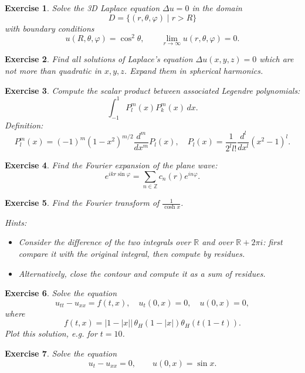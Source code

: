 \documentclass[11pt,a4paper]{article}
\newtheorem*{exercise}{Exercise}
\begin{document}
{\begin{exercise}
	Solve the 3D Laplace equation $\Delta u = 0$ in the domain
	\[
	D = \{(r, \theta, \varphi) \mid r > R\}
	\]
	with boundary conditions
	\[
	u(R, \theta, \varphi) = \cos^2\theta, \qquad \lim_{r \to \infty} u(r, \theta, \varphi) = 0.
	\]
\end{exercise}

\begin{exercise}
	Find all solutions of Laplace’s equation $\Delta u(x, y, z) = 0$ which are not more than quadratic in $x, y, z$.  
	Expand them in spherical harmonics.
\end{exercise}

\begin{exercise}
	Compute the scalar product between associated Legendre polynomials:
	\[
	\int_{-1}^{1} P_l^m(x) P_k^m(x)\,dx.
	\]
	Definition:
	\[
	P_l^m(x) = (-1)^m (1 - x^2)^{m/2} \frac{d^m}{dx^m} P_l(x), \quad
	P_l(x) = \frac{1}{2^l l!} \frac{d^l}{dx^l}(x^2 - 1)^l.
	\]
\end{exercise}

\begin{exercise}
	Find the Fourier expansion of the plane wave:
	\[
	e^{ikr\sin\varphi} = \sum_{n\in\mathbb{Z}} c_n(r)e^{in\varphi}.
	\]
\end{exercise}
}


\begin{exercise}
	Find the Fourier transform of $\frac{1}{\cosh x}$.
	
	\textit{Hints:}
	\begin{itemize}
		\item Consider the difference of the two integrals over $\mathbb{R}$ and over $\mathbb{R} + 2\pi i$: first compare it with the original integral, then compute by residues.
		\item Alternatively, close the contour and compute it as a sum of residues.
	\end{itemize}
\end{exercise}

\begin{exercise}
	Solve the equation
	\[
	u_{tt} - u_{xx} = f(t, x), \quad u_t(0, x) = 0, \quad u(0, x) = 0,
	\]
	where
	\[
	f(t, x) = |1 - |x|| \, \theta_H(1 - |x|)\theta_H(t(1 - t)).
	\]
	Plot this solution, e.g. for $t = 10$.
\end{exercise}



\begin{exercise}
	Solve the equation
	\[
	u_t - u_{xx} = 0, \qquad u(0, x) = \sin x.
	\]
\end{exercise}
\end{document}
